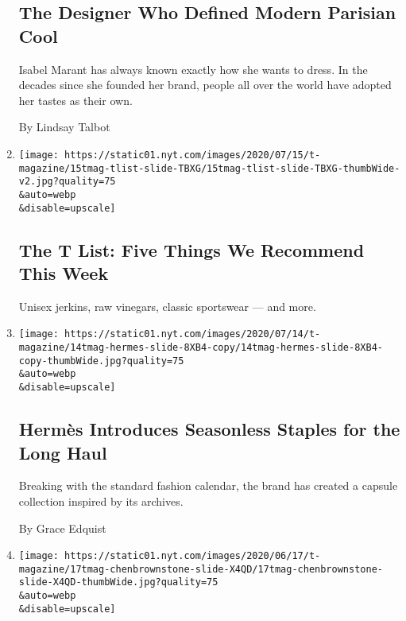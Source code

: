 \begin{enumerate}
{  \subsection{The Designer Who Defined Modern Parisian
  Cool}\label{the-designer-who-defined-modern-parisian-cool}}

  Isabel Marant has always known exactly how she wants to dress. In the
  decades since she founded her brand, people all over the world have
  adopted her tastes as their own.

  By Lindsay Talbot
\item
  \href{/2020/07/16/t-magazine/margo-price-album-tlist.html}{}

  \texttt{[image: https://static01.nyt.com/images/2020/07/15/t-magazine/15tmag-tlist-slide-TBXG/15tmag-tlist-slide-TBXG-thumbWide-v2.jpg?quality=75\\\&auto=webp\\\&disable=upscale]}

  \hypertarget{the-t-list-five-things-we-recommend-this-week-1}{%
  \subsection{The T List: Five Things We Recommend This
  Week}\label{the-t-list-five-things-we-recommend-this-week-1}}

  Unisex jerkins, raw vinegars, classic sportswear --- and more.
\item
  \href{/2020/07/15/t-magazine/hermes-fashion-savoir-faire.html}{}

  \texttt{[image: https://static01.nyt.com/images/2020/07/14/t-magazine/14tmag-hermes-slide-8XB4-copy/14tmag-hermes-slide-8XB4-copy-thumbWide.jpg?quality=75\\\&auto=webp\\\&disable=upscale]}

  \hypertarget{hermuxe8s-introduces-seasonless-staples-for-the-long-haul}{%
  \subsection{Hermès Introduces Seasonless Staples for the Long
  Haul}\label{hermuxe8s-introduces-seasonless-staples-for-the-long-haul}}

  Breaking with the standard fashion calendar, the brand has created a
  capsule collection inspired by its archives.

  By Grace Edquist
\item
  \href{/2020/07/13/t-magazine/brownstone-brooklyn-design.html}{}

  \texttt{[image: https://static01.nyt.com/images/2020/06/17/t-magazine/17tmag-chenbrownstone-slide-X4QD/17tmag-chenbrownstone-slide-X4QD-thumbWide.jpg?quality=75\\\&auto=webp\\\&disable=upscale]}


\end{enumerate}
